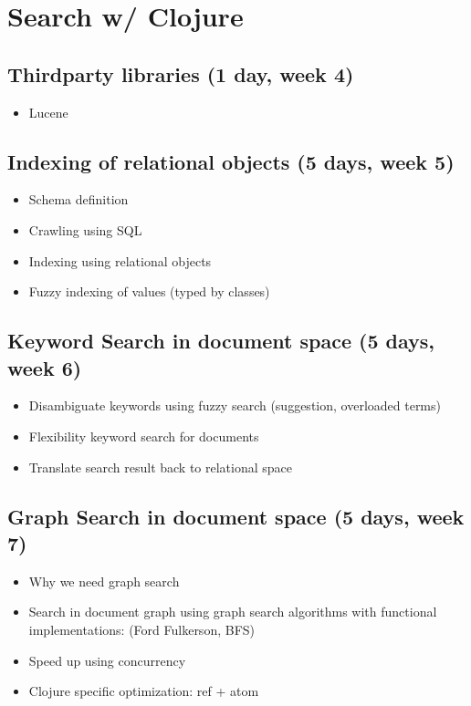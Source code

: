 \section{Search w/ Clojure}
	\subsection{Thirdparty libraries (1 day, week 4)}
		\begin{itemize}
			\item Lucene
		\end{itemize}

	\subsection{Indexing of relational objects (5 days, week 5)}
		\begin{itemize}
			\item Schema definition
			\item Crawling using SQL
			\item Indexing using relational objects
			\item Fuzzy indexing of values (typed by classes)
		\end{itemize}

	\subsection{Keyword Search in document space (5 days, week 6)}
		\begin{itemize}
			\item Disambiguate keywords using fuzzy search (suggestion, overloaded terms)
			\item Flexibility keyword search for documents
			\item Translate search result back to relational space
		\end{itemize}

	\subsection{Graph Search in document space (5 days, week 7)}
		\begin{itemize}
			\item Why we need graph search
			\item Search in document graph using graph search algorithms with functional implementations: (Ford Fulkerson, BFS)
			\item Speed up using concurrency
			\item Clojure specific optimization: ref + atom
		\end{itemize}